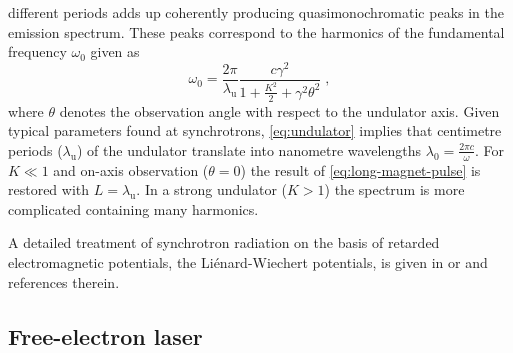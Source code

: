 \documentclass[
twoside,
openright,
titlepage,
numbers=noenddot,
headinclude,
fleqn,
a4paper,
footinclude=true,
cleardoublepage=empty,
abstractoff,
BCOR=5mm,
paper=a4,
fontsize=11pt,
british,ngerman,american,
]{scrreprt}
\begin{document}
different periods adds up coherently producing quasimonochromatic
peaks in the emission spectrum.  These peaks correspond to the
harmonics of the fundamental frequency $\omega_0$ given as
\begin{equation}
  \label{eq:undulator}
   \omega_0 = \frac{2\pi}{\lambda_\mathrm{u}}
   \frac{c\gamma^2}{1+\frac{K^2}{2}+\gamma^2\theta^2} \;,
\end{equation}
where $\theta$ denotes the observation angle with respect to the
undulator axis.  Given typical parameters found at synchrotrons,
\cref{eq:undulator} implies that centimetre periods
($\lambda_{\mathrm{u}}$) of the undulator translate into nanometre
wavelengths $\lambda_0=\frac{2\pi c}{\omega}$.  For $K\ll1$ and
on-axis observation ($\theta=0$) the result of
\cref{eq:long-magnet-pulse} is restored with $L=\lambda_{\mathrm{u}}$.
In a strong undulator ($K > 1$) the spectrum is more complicated
containing many harmonics.

A detailed treatment of synchrotron radiation on the basis of retarded
electromagnetic potentials, the Liénard-Wiechert potentials, is
given in \cite{Kim1989} or \cite{Hofmann2004Book} and references
therein.

\subsection{Free-electron laser}
\label{sec:fel}
\end{document}
